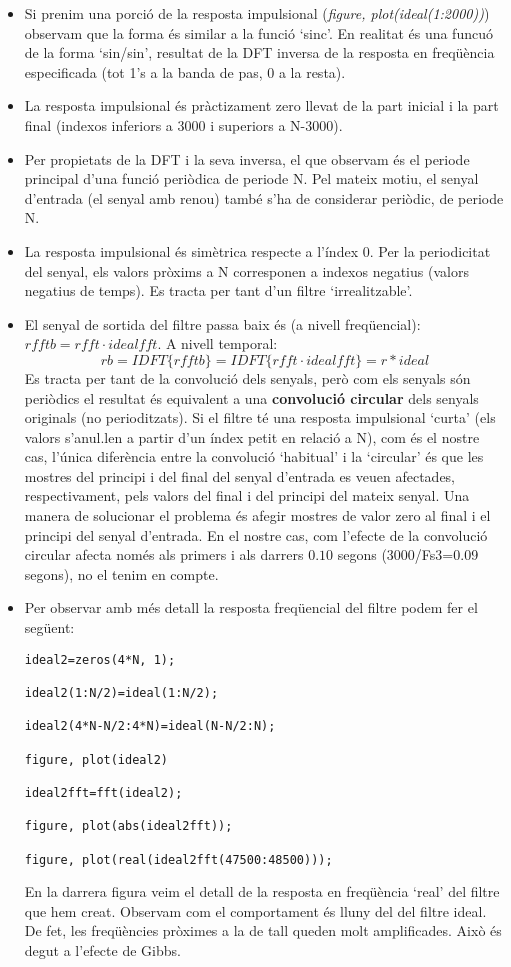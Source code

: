 \documentclass{article}
\begin{document}
\begin{itemize}
\item Si prenim una porció de la resposta impulsional (\textit{figure, plot(ideal(1:2000))})
observam que la forma és similar a la funció `sinc'.
En realitat és una funcuó de la forma `sin/sin', resultat de la DFT inversa de la resposta en freqüència
especificada (tot 1's a la banda de pas, 0 a la resta).
\item La resposta impulsional és pràctizament zero llevat de la part inicial i la part final (indexos inferiors 
a 3000 i superiors a N-3000).
\item Per propietats de la DFT i la seva inversa, el que observam és el periode principal d'una funció periòdica
de periode N. Pel mateix motiu, el senyal d'entrada (el senyal amb renou) també s'ha de considerar periòdic, de
periode N.
\item La resposta impulsional és simètrica respecte a l'índex 0. Per la periodicitat del senyal, els valors pròxims a N
corresponen a indexos negatius (valors negatius de temps). Es tracta per tant d'un filtre `irrealitzable'.
\item El senyal de sortida del filtre passa baix és (a nivell freqüencial): $rfftb=rfft \cdot idealfft$.
A nivell temporal:
\[
rb=IDFT\{rfftb\}=IDFT\{rfft \cdot idealfft\}=r * ideal
\]
Es tracta per tant de la convolució dels senyals, però com els senyals són periòdics el resultat és equivalent a una
\textbf{convolució circular} dels senyals originals (no perioditzats).
Si el filtre té una resposta impulsional `curta' (els valors s'anul.len a partir d'un índex petit en relació a N), com és el nostre cas,
l'única diferència entre la convolució `habitual' i la `circular' és que les mostres del principi i del final del senyal d'entrada 
es veuen afectades, respectivament, pels valors del final i del principi del mateix senyal. Una manera de solucionar
el problema és afegir mostres de valor zero al final i el principi del senyal d'entrada. En el nostre cas, com l'efecte
de la convolució circular afecta només als primers i als darrers $0.10$ segons (3000/Fs3=0.09 segons), no el tenim en compte.
\item Per observar amb més detall la resposta freqüencial del filtre podem fer el següent:
\begin{verbatim}
ideal2=zeros(4*N, 1);

ideal2(1:N/2)=ideal(1:N/2);

ideal2(4*N-N/2:4*N)=ideal(N-N/2:N);

figure, plot(ideal2)

ideal2fft=fft(ideal2);

figure, plot(abs(ideal2fft));

figure, plot(real(ideal2fft(47500:48500)));
\end{verbatim}
En la darrera figura veim el detall de la resposta en freqüència `real' del filtre que hem creat. Observam com el comportament 
és lluny del del filtre ideal. De fet, les freqüències pròximes a la de tall queden molt amplificades. Això és degut a l'efecte de Gibbs.

\end{itemize}
\end{document}
